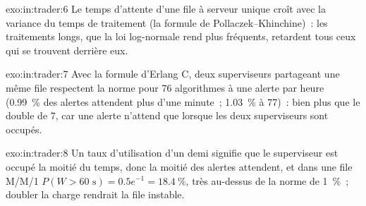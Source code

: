 \begin{solution}{exo:in:trader:6}
Le temps d'attente d'une file à serveur unique croît avec la variance du temps de traitement (la
formule de Pollaczek--Khinchine)~: les traitements longs, que la loi log-normale rend plus fréquents, retardent tous ceux qui se trouvent derrière eux.
\end{solution}

\begin{solution}{exo:in:trader:7}
Avec la formule d'Erlang C, deux superviseurs partageant une même file respectent la norme pour 76 algorithmes à une alerte par heure
(0.99~\% des alertes attendent plus d'une minute~; 1.03~\% à 77)~: bien plus que le double de 7, car une alerte n'attend que lorsque les deux superviseurs sont occupés.
\end{solution}

\begin{solution}{exo:in:trader:8}
Un taux d'utilisation d'un demi signifie que le superviseur est occupé la moitié du temps, donc la moitié des alertes attendent, et dans une file M/M/1
$P(W>60\text{ s})=0.5e^{-1}=18.4~\%$, très au-dessus de la norme de 1~\%~; doubler la charge rendrait la file instable.
\end{solution}

